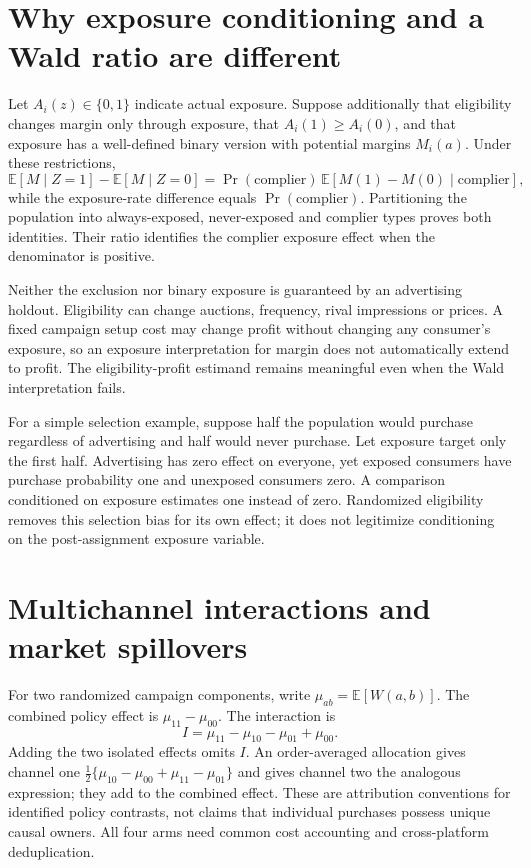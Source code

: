 \documentclass[11pt]{article}
\begin{document}
\section{Why exposure conditioning and a Wald ratio are different}
Let $A_i(z)\in\{0,1\}$ indicate actual exposure. Suppose additionally that eligibility changes margin only through exposure, that $A_i(1)\geq A_i(0)$, and that exposure has a well-defined binary version with potential margins $M_i(a)$. Under these restrictions,
\[
 \mathbb E[M\mid Z=1]-\mathbb E[M\mid Z=0]
 =\Pr(\text{complier})\,\mathbb E[M(1)-M(0)\mid\text{complier}],
\]
while the exposure-rate difference equals $\Pr(\text{complier})$. Partitioning the population into always-exposed, never-exposed and complier types proves both identities. Their ratio identifies the complier exposure effect when the denominator is positive.

Neither the exclusion nor binary exposure is guaranteed by an advertising holdout. Eligibility can change auctions, frequency, rival impressions or prices. A fixed campaign setup cost may change profit without changing any consumer's exposure, so an exposure interpretation for margin does not automatically extend to profit. The eligibility-profit estimand remains meaningful even when the Wald interpretation fails.

For a simple selection example, suppose half the population would purchase regardless of advertising and half would never purchase. Let exposure target only the first half. Advertising has zero effect on everyone, yet exposed consumers have purchase probability one and unexposed consumers zero. A comparison conditioned on exposure estimates one instead of zero. Randomized eligibility removes this selection bias for its own effect; it does not legitimize conditioning on the post-assignment exposure variable.

\section{Multichannel interactions and market spillovers}
For two randomized campaign components, write $\mu_{ab}=\mathbb E[W(a,b)]$. The combined policy effect is $\mu_{11}-\mu_{00}$. The interaction is
\[
 I=\mu_{11}-\mu_{10}-\mu_{01}+\mu_{00}.
\]
Adding the two isolated effects omits $I$. An order-averaged allocation gives channel one
$\tfrac12\{\mu_{10}-\mu_{00}+\mu_{11}-\mu_{01}\}$ and gives channel two the analogous expression; they add to the combined effect. These are attribution conventions for identified policy contrasts, not claims that individual purchases possess unique causal owners. All four arms need common cost accounting and cross-platform deduplication.
\end{document}
